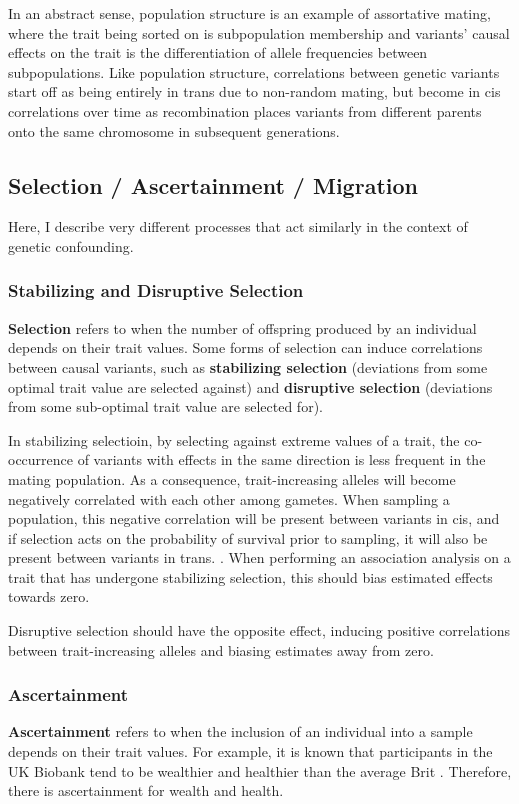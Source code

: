 \documentclass[12pt]{article}
\begin{document}
In an abstract sense, population structure is an example of assortative mating, where the trait being sorted on is subpopulation membership and variants' causal effects on the trait is the differentiation of allele frequencies between subpopulations.
Like population structure, correlations between genetic variants start off as being entirely in trans due to non-random mating, but become in cis correlations over time as recombination places variants from different parents onto the same chromosome in subsequent generations.

\subsection{Selection / Ascertainment / Migration}
Here, I describe very different processes that act similarly in the context of genetic confounding.

\subsubsection{Stabilizing and Disruptive Selection}
\textbf{Selection} refers to when the number of offspring produced by an individual depends on their trait values.
Some forms of selection can induce correlations between causal variants, such as \textbf{stabilizing selection} (deviations from some optimal trait value are selected against) and \textbf{disruptive selection} (deviations from some sub-optimal trait value are selected for).

In stabilizing selectioin, by selecting against extreme values of a trait, the co-occurrence of variants with effects in the same direction is less frequent in the mating population.
As a consequence, trait-increasing alleles will become negatively correlated with each other among gametes.
When sampling a population, this negative correlation will be present between variants in cis, and if selection acts on the probability of survival prior to sampling, it will also be present between variants in trans. .
When performing an association analysis on a trait that has undergone stabilizing selection, this should bias estimated effects towards zero.

Disruptive selection should have the opposite effect, inducing positive correlations between trait-increasing alleles and biasing estimates away from zero.

\subsubsection{Ascertainment}
\textbf{Ascertainment} refers to when the inclusion of an individual into a sample depends on their trait values.
For example, it is known that participants in the UK Biobank tend to be wealthier and healthier than the average Brit \todo{[To-do: ref]}.
Therefore, there is ascertainment for wealth and health.
\end{document}
